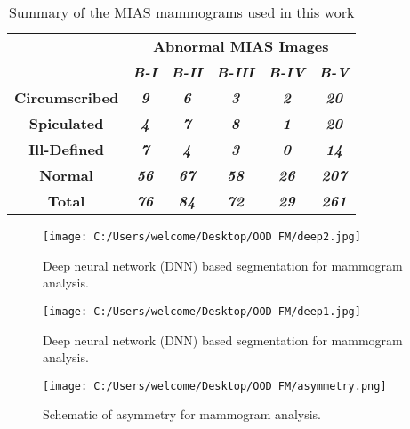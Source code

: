 \documentclass[conference]{IEEEtran}
\begin{document}
\begin{table}[htbp]
\caption{Summary of the MIAS mammograms used in this work}
\begin{center}
\begin{tabular}{|c|c|c|c|c|c}
\hline 
\textbf{ }&\multicolumn{5}{|c|}{\textbf{Abnormal MIAS Images}} \\
\cline{2-5} 
\textbf{ } & \textbf{\textit{B-I}}& \textbf{\textit{B-II}}& \textbf{\textit{B-III}}&  \textbf{\textit{B-IV}}&  \textbf{\textit{B-V}}\\

\hline
\textbf{ Circumscribed  } & \textbf{\textit{9}}& \textbf{\textit{6}}& \textbf{\textit{3}}&  \textbf{\textit{2}}&  \textbf{\textit{20}}\\
\textbf{ Spiculated   } & \textbf{\textit{4}}& \textbf{\textit{7}}& \textbf{\textit{8}}&  \textbf{\textit{1}}&  \textbf{\textit{20}}\\
\textbf{ Ill-Defined  } & \textbf{\textit{7}}& \textbf{\textit{4}}& \textbf{\textit{3}}&  \textbf{\textit{0}}&  \textbf{\textit{14}}\\
\textbf{ Normal  } & \textbf{\textit{56}}& \textbf{\textit{67}}& \textbf{\textit{58}}&  \textbf{\textit{26}}&  \textbf{\textit{207}}\\
\textbf{ Total  } & \textbf{\textit{76}}& \textbf{\textit{84}}& \textbf{\textit{72}}&  \textbf{\textit{29}}&  \textbf{\textit{261}}\\
\hline
\end{tabular}
\label{tab1}
\end{center}
\end{table}

\begin{figure}[htbp]
\centerline{\texttt{[image: C:/Users/welcome/Desktop/OOD FM/deep2.jpg]}}
\caption{Deep neural network (DNN) based segmentation for mammogram analysis.}
\label{fig}
\end{figure}


\begin{figure}[htbp]
\centerline{\texttt{[image: C:/Users/welcome/Desktop/OOD FM/deep1.jpg]}}
\caption{Deep neural network (DNN) based segmentation for mammogram analysis.}
\label{fig}
\end{figure}

\begin{figure}[htbp]
\centerline{\texttt{[image: C:/Users/welcome/Desktop/OOD FM/asymmetry.png]}}
\caption{Schematic of asymmetry for mammogram analysis.}
\label{fig}
\end{figure}
\end{document}
